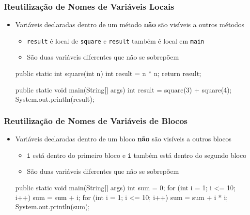 \documentclass[xcolor={dvipsnames,table},aspectratio=169]{beamer}
\begin{document}
\begin{frame}[fragile]\frametitle{Reutilização de Nomes de Variáveis Locais}
\begin{itemize}
	\item Variáveis declaradas dentro de um método \textbf{não} são visíveis a outros métodos
	\begin{itemize}
		\item \texttt{result} é local de \texttt{square} e \texttt{result} também é local em \texttt{main}
		\item São duas variáveis diferentes que não se sobrepõem
	\end{itemize}
\begin{javacode}
public static int square(int n) {
  int result = n * n;
  return result;
}

public static void main(String[] args) {
  int result = square(3) + square(4);
  System.out.println(result);
}
\end{javacode}
\end{itemize}
\end{frame}

\begin{frame}[fragile]\frametitle{Reutilização de Nomes de Variáveis de Blocos}
\begin{itemize}
	\item Variáveis declaradas dentro de um bloco \textbf{não} são visíveis a outros blocos
	\begin{itemize}
		\item \texttt{i} está dentro do primeiro bloco e \texttt{i} também está dentro do segundo bloco
		\item São duas variáveis diferentes que não se sobrepõem
	\end{itemize}
\begin{javacode}
public static void main(String[] args) {
  int sum = 0;
  for (int i = 1; i <= 10; i++) {
    sum = sum + i;
  }
  for (int i = 1; i <= 10; i++) {
    sum = sum + i * i;
  }
  System.out.println(sum);
}
\end{javacode}
\end{itemize}
\end{frame}
\end{document}
